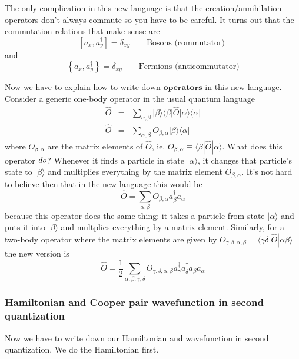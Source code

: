 \documentclass{article}
\begin{document}
The only complication in this new language is that the creation/annihilation
operators don't always commute so you have to be careful. It turns
out that the commutation relations that make sense are\[
\left[a_{x},a_{y}^{\dagger}\right]=\delta_{xy}\qquad\textrm{Bosons (commutator) }\]
and\[
\left\{ a_{x},a_{y}^{\dagger}\right\} =\delta_{xy}\qquad\textrm{Fermions (anticommutator)}\]


Now we have to explain how to write down $\textbf{operators}$ in
this new language. Consider a generic one-body operator in the usual
quantum language\begin{eqnarray*}
\hat{O} & = & \sum_{\alpha,\beta}|\beta\rangle\langle\beta|\hat{O}|\alpha\rangle\langle\alpha|\\
\hat{O} & = & \sum_{\alpha,\beta}O_{\beta,\alpha}|\beta\rangle\langle\alpha|\end{eqnarray*}
where $O_{\beta,\alpha}$ are the matrix elements of $\hat{O}$, ie.
$O_{\beta,\alpha}\equiv\langle\beta|\hat{O}|\alpha\rangle$. What
does this operator $\emph{do}$? Whenever it finds a particle in state
$|\alpha\rangle$, it changes that particle's state to $|\beta\rangle$
and multiplies everything by the matrix element $O_{\beta,\alpha}$.
It's not hard to believe then that in the new language this would
be\[
\hat{O}=\sum_{\alpha,\beta}O_{\beta,\alpha}a_{\beta}^{\dagger}a_{\alpha}\]
because this operator does the same thing: it takes a particle from
state $|\alpha\rangle$ and puts it into $|\beta\rangle$ and multplies
everything by a matrix element. Similarly, for a two-body operator
where the matrix elements are given by $O_{\gamma,\delta,\alpha,\beta}=\langle\gamma\delta|\hat{O}|\alpha\beta\rangle$
the new version is\[
\hat{O}=\frac{1}{2}\sum_{\alpha,\beta,\gamma,\delta}O_{\gamma,\delta,\alpha,\beta}a_{\gamma}^{\dagger}a_{\delta}^{\dagger}a_{\beta}a_{\alpha}\]



\subsubsection*{Hamiltonian and Cooper pair wavefunction in second quantization}

Now we have to write down our Hamiltonian and wavefunction in second
quantization. We do the Hamiltonian first.
\end{document}
